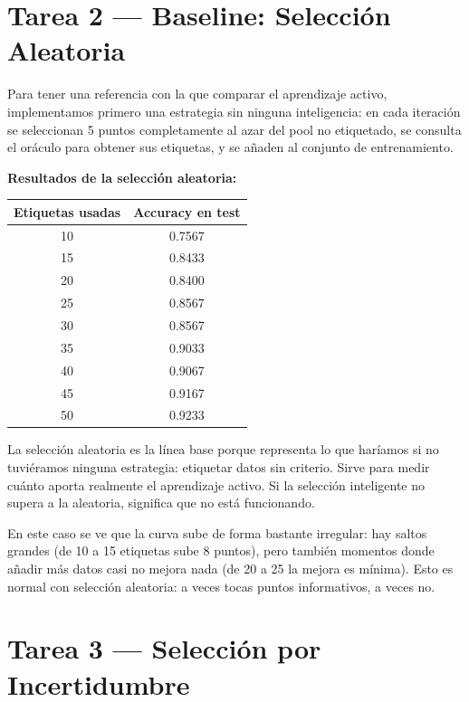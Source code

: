 \documentclass[../../__memoria.tex]{subfiles}
\begin{document}
\section[Tarea 2: Baseline Aleatorio]{Tarea 2 --- Baseline: Selección Aleatoria}

Para tener una referencia con la que comparar el aprendizaje activo, implementamos primero una estrategia sin ninguna inteligencia: en cada iteración se seleccionan 5 puntos completamente al azar del pool no etiquetado, se consulta el oráculo para obtener sus etiquetas, y se añaden al conjunto de entrenamiento.

\textbf{Resultados de la selección aleatoria:}

\begin{center}
\begin{tabular}{cc}
\toprule
\textbf{Etiquetas usadas} & \textbf{Accuracy en test} \\
\midrule
10  & 0.7567 \\
15  & 0.8433 \\
20  & 0.8400 \\
25  & 0.8567 \\
30  & 0.8567 \\
35  & 0.9033 \\
40  & 0.9067 \\
45  & 0.9167 \\
50  & 0.9233 \\
\bottomrule
\end{tabular}
\end{center}

La selección aleatoria es la línea base porque representa lo que haríamos si no tuviéramos ninguna estrategia: etiquetar datos sin criterio. Sirve para medir cuánto aporta realmente el aprendizaje activo. Si la selección inteligente no supera a la aleatoria, significa que no está funcionando.

En este caso se ve que la curva sube de forma bastante irregular: hay saltos grandes (de 10 a 15 etiquetas sube 8 puntos), pero también momentos donde añadir más datos casi no mejora nada (de 20 a 25 la mejora es mínima). Esto es normal con selección aleatoria: a veces tocas puntos informativos, a veces no.

\section[Tarea 3: Active Learning por Incertidumbre]{Tarea 3 --- Selección por Incertidumbre}
\end{document}
